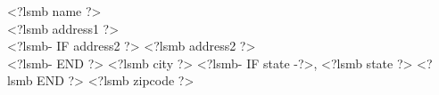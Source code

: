 \documentclass{scrartcl}
\begin{document}
\thispagestyle{empty}
\noindent <?lsmb name ?>\\
<?lsmb address1 ?> \\
<?lsmb- IF address2 ?>
<?lsmb address2 ?> \\
<?lsmb- END ?>
<?lsmb city ?>
<?lsmb- IF state -?>, <?lsmb state ?> <?lsmb END ?> <?lsmb zipcode ?>\\
\end{document}
